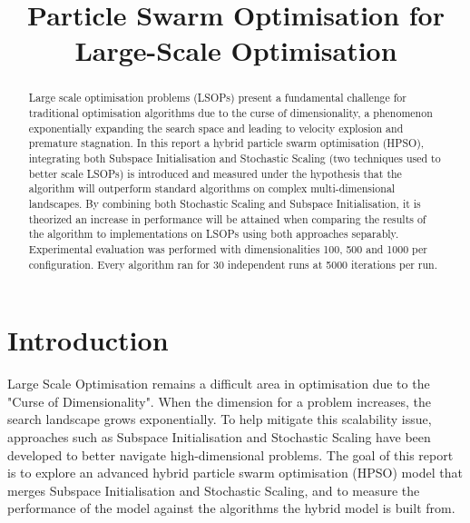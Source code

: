 \documentclass[conference]{IEEEtran}
\begin{document}
\title{Particle Swarm Optimisation for Large-Scale Optimisation}

\author{
}

\maketitle
\thispagestyle{plain}
\pagestyle{plain}

\begin{abstract}
    Large scale optimisation problems (LSOPs) present a fundamental challenge for traditional optimisation algorithms due to 
    the curse of dimensionality, a phenomenon exponentially expanding the search space and leading to 
    velocity explosion and premature stagnation. In this report a hybrid particle swarm optimisation (HPSO), 
    integrating both Subspace Initialisation and Stochastic Scaling (two techniques used to better scale LSOPs) is introduced and measured under the hypothesis that the algorithm 
    will outperform standard algorithms on complex multi-dimensional landscapes. By combining both Stochastic Scaling and 
    Subspace Initialisation, it is theorized an increase in performance will be attained when comparing the results of the algorithm 
    to implementations on LSOPs using both approaches separably. Experimental evaluation was performed with dimensionalities 
    100, 500 and 1000 per configuration. Every algorithm ran for 30 independent runs at 5000 iterations per run.
\end{abstract}

\section{Introduction}
    Large Scale Optimisation remains a difficult area in optimisation due to the "Curse of Dimensionality". When the 
    dimension for a problem increases, the search landscape grows exponentially. To help mitigate this scalability issue, approaches such as 
    Subspace Initialisation and Stochastic Scaling have been developed to better navigate high-dimensional problems. The 
    goal of this report is to explore an advanced hybrid particle swarm optimisation (HPSO) model that merges Subspace 
    Initialisation and Stochastic Scaling, and to measure the performance of the model against the algorithms the hybrid model is built from. 
\end{document}

